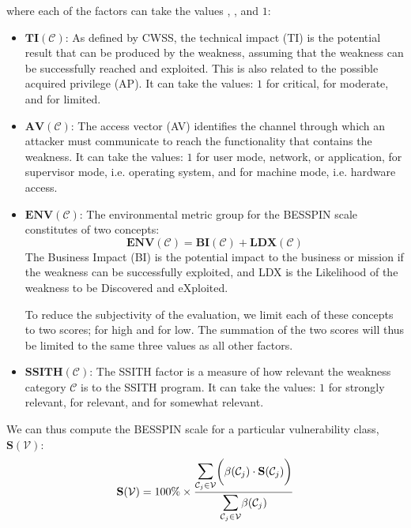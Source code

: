 \documentclass{article}
\begin{document}
where each of the factors can take the values , , and $1$:
\begin{itemize}
    \item $\mathbf{TI}(\mathcal{C})$: As defined by CWSS, the technical impact (TI) is the potential result that can be produced by the weakness, assuming that the weakness can be successfully reached and exploited. This is also related to the possible acquired privilege (AP). It can take the values: $1$ for critical,  for moderate, and  for limited.
    \item $\mathbf{AV}(\mathcal{C})$: The access vector (AV) identifies the channel through which an attacker must communicate to reach the functionality that contains the weakness. It can take the values: $1$ for user mode, network, or application,  for supervisor mode, i.e. operating system, and  for machine mode, i.e. hardware access.
    \item $\mathbf{ENV}(\mathcal{C})$: The environmental metric group for the BESSPIN scale constitutes of two concepts:
    \begin{equation}
        \mathbf{ENV}(\mathcal{C}) = \mathbf{BI}(\mathcal{C}) + \mathbf{LDX}(\mathcal{C})
    \end{equation}
    The Business Impact (BI) is the potential impact to the business or mission if the weakness can be successfully exploited, and LDX is the Likelihood of the weakness to be Discovered and eXploited. 
    
    To reduce the subjectivity of the evaluation, we limit each of these concepts to two scores;  for high and  for low. The summation of the two scores will thus be limited to the same three values as all other factors.
    \item $\mathbf{SSITH}(\mathcal{C})$: The SSITH factor is a measure of how relevant the weakness category $\mathcal{C}$ is to the SSITH program. It can take the values: $1$ for strongly relevant,  for relevant, and  for somewhat relevant. 
\end{itemize} 

We can thus compute the BESSPIN scale for a particular vulnerability class, $\mathbf{S}(\mathcal{V})$:
\begin{equation}
  \mathbf{S}(\mathcal{V}) =
    100\% \times \frac{
      \mathlarger{\mathlarger{\sum}}_{\mathcal{C}_{j} \in \mathcal{V}} \bigg( \beta(\mathcal{C}_{j}) \cdot \mathbf{S}(\mathcal{C}_{j}) \bigg)
    }{
      \mathlarger{\mathlarger{\sum}}_{\mathcal{C}_{j} \in \mathcal{V}} \beta(\mathcal{C}_{j})
    }
\end{equation}
\end{document}

